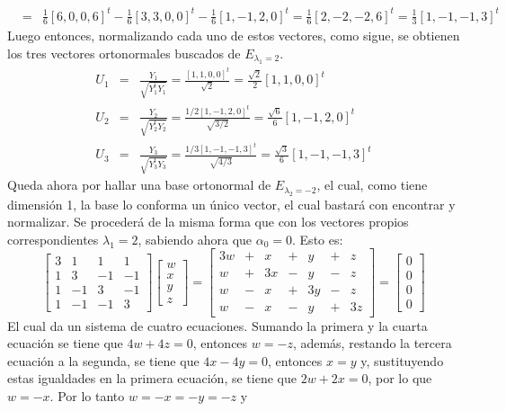 \begin{solucion}
\begin{enumerate}[$a$)]
\begin{eqnarray*}
   & = & \frac{1}{6}[6,0,0,6]^t - \frac{1}{6}[3,3,0,0]^t - \frac{1}{6}[1,-1,2,0]^t = \frac{1}{6}[2,-2,-2,6]^t = \frac{1}{3}[1,-1,-1,3]^t
  \end{eqnarray*}
  Luego entonces, normalizando cada uno de estos vectores, como sigue, se obtienen los tres vectores ortonormales buscados de $E_{\lambda_1 = 2}$.
  \begin{eqnarray*}
   U_1 & = & \frac{Y_1}{\sqrt{Y_1^tY_1}} = \frac{[1,1,0,0]^t}{\sqrt{2}} = \frac{\sqrt{2}}{2}[1,1,0,0]^t \\
   U_2 & = & \frac{Y_2}{\sqrt{Y_2^tY_2}} = \frac{1/2[1,-1,2,0]^t}{\sqrt{3/2}} = \frac{\sqrt{6}}{6}[1,-1,2,0]^t \\
   U_3 & = & \frac{Y_3}{\sqrt{Y_3^tY_3}} = \frac{1/3[1,-1,-1,3]^t}{\sqrt{4/3}} = \frac{\sqrt{3}}{6}[1,-1,-1,3]^t
  \end{eqnarray*}
  Queda ahora por hallar una base ortonormal de $E_{\lambda_2 = -2}$, el cual, como tiene dimensi\'on 1, la base lo conforma un \'unico vector, el cual bastar\'a con encontrar y normalizar. Se proceder\'a de la misma forma que con los vectores propios correspondientes $\lambda_1 = 2$, sabiendo ahora que $\alpha_0 = 0$. Esto es:
  \begin{equation*}
   \begin{bmatrix}
    3 &  1 &  1 &  1 \\
    1 &  3 & -1 & -1 \\
    1 & -1 &  3 & -1 \\
    1 & -1 & -1 &  3
   \end{bmatrix}
   \begin{bmatrix}
    w \\ x \\ y \\ z 
   \end{bmatrix}
   = 
   \begin{bmatrix}
    3w & + & x & + & y & + & z \\
    w & + & 3x & - & y & - & z \\
    w & - & x & + & 3y & - & z \\
    w & - & x & - & y & + & 3z
   \end{bmatrix}
   =
   \begin{bmatrix}
    0 \\ 0 \\ 0 \\ 0
   \end{bmatrix}
  \end{equation*}
  El cual da un sistema de cuatro ecuaciones. Sumando la primera y la cuarta ecuaci\'on se tiene que $4w + 4z = 0$, entonces $w = - z$, adem\'as, restando la tercera ecuaci\'on a la segunda, se tiene que $4x - 4y = 0$, entonces $x=y$ y, sustituyendo estas igualdades en la primera ecuaci\'on, se tiene que $2w + 2x = 0$, por lo que $w = -x$. Por lo tanto $w = -x = -y = -z$ y

\end{enumerate}
\end{solucion}
